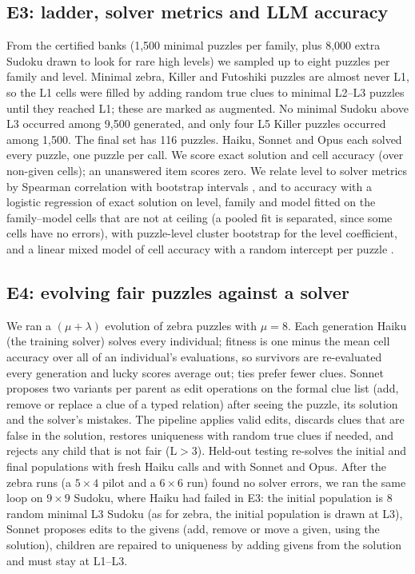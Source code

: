 \subsection{E3: ladder, solver metrics and LLM accuracy}

From the certified banks (1,500 minimal puzzles per family, plus 8,000 extra Sudoku drawn to look for rare high levels) we sampled up to eight puzzles per family and level. Minimal zebra, Killer and Futoshiki puzzles are almost never L1, so the L1 cells were filled by adding random true clues to minimal L2--L3 puzzles until they reached L1; these are marked as augmented. No minimal Sudoku above L3 occurred among 9,500 generated, and only four L5 Killer puzzles occurred among 1,500. The final set has 116 puzzles. Haiku, Sonnet and Opus each solved every puzzle, one puzzle per call. We score exact solution and cell accuracy (over non-given cells); an unanswered item scores zero. We relate level to solver metrics by Spearman correlation with bootstrap intervals \citep{efron1993bootstrap}, and to accuracy with a logistic regression of exact solution on level, family and model fitted on the family--model cells that are not at ceiling (a pooled fit is separated, since some cells have no errors), with puzzle-level cluster bootstrap for the level coefficient, and a linear mixed model of cell accuracy with a random intercept per puzzle \citep{seabold2010statsmodels}.

\subsection{E4: evolving fair puzzles against a solver}

We ran a $(\mu{+}\lambda)$ evolution of zebra puzzles with $\mu=8$. Each generation Haiku (the training solver) solves every individual; fitness is one minus the mean cell accuracy over all of an individual's evaluations, so survivors are re-evaluated every generation and lucky scores average out; ties prefer fewer clues. Sonnet proposes two variants per parent as edit operations on the formal clue list (add, remove or replace a clue of a typed relation) after seeing the puzzle, its solution and the solver's mistakes. The pipeline applies valid edits, discards clues that are false in the solution, restores uniqueness with random true clues if needed, and rejects any child that is not fair (L$>$3). Held-out testing re-solves the initial and final populations with fresh Haiku calls and with Sonnet and Opus. After the zebra runs (a $5{\times}4$ pilot and a $6{\times}6$ run) found no solver errors, we ran the same loop on $9{\times}9$ Sudoku, where Haiku had failed in E3: the initial population is 8 random minimal L3 Sudoku (as for zebra, the initial population is drawn at L3), Sonnet proposes edits to the givens (add, remove or move a given, using the solution), children are repaired to uniqueness by adding givens from the solution and must stay at L1--L3.

